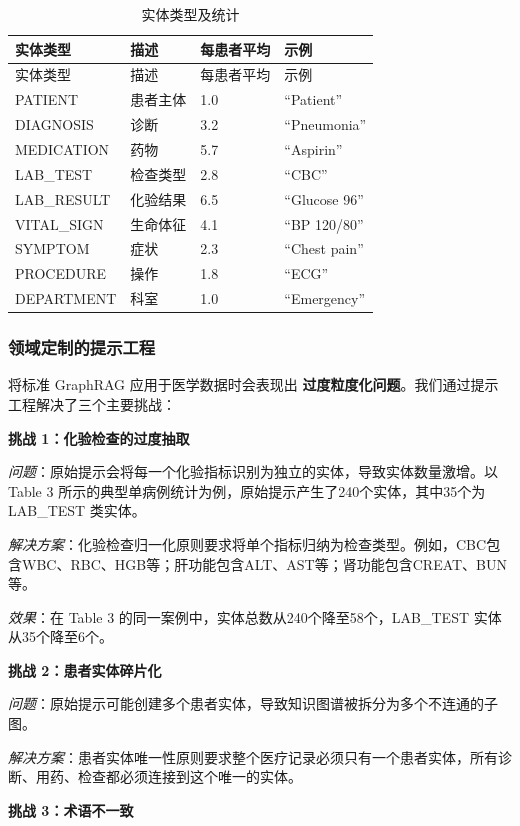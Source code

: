 \documentclass[11pt]{article}
\begin{document}
\begin{longtable}[]{@{}llll@{}}
\caption{实体类型及统计}\tabularnewline
\toprule\noalign{}
实体类型 & 描述 & 每患者平均 & 示例 \\
\midrule\noalign{}
\endfirsthead
\toprule\noalign{}
实体类型 & 描述 & 每患者平均 & 示例 \\
\midrule\noalign{}
\endhead
\bottomrule\noalign{}
\endlastfoot
PATIENT & 患者主体 & 1.0 & ``Patient'' \\
DIAGNOSIS & 诊断 & 3.2 & ``Pneumonia'' \\
MEDICATION & 药物 & 5.7 & ``Aspirin'' \\
LAB\_TEST & 检查类型 & 2.8 & ``CBC'' \\
LAB\_RESULT & 化验结果 & 6.5 & ``Glucose 96'' \\
VITAL\_SIGN & 生命体征 & 4.1 & ``BP 120/80'' \\
SYMPTOM & 症状 & 2.3 & ``Chest pain'' \\
PROCEDURE & 操作 & 1.8 & ``ECG'' \\
DEPARTMENT & 科室 & 1.0 & ``Emergency'' \\
\end{longtable}

\subsubsection{领域定制的提示工程}

将标准 GraphRAG 应用于医学数据时会表现出 \textbf{过度粒度化问题}。我们通过提示工程解决了三个主要挑战：

\textbf{挑战 1：化验检查的过度抽取}

\emph{问题}：原始提示会将每一个化验指标识别为独立的实体，导致实体数量激增。以 Table 3 所示的典型单病例统计为例，原始提示产生了240个实体，其中35个为 LAB\_TEST 类实体。

\emph{解决方案}：化验检查归一化原则要求将单个指标归纳为检查类型。例如，CBC包含WBC、RBC、HGB等；肝功能包含ALT、AST等；肾功能包含CREAT、BUN等。

\emph{效果}：在 Table 3 的同一案例中，实体总数从240个降至58个，LAB\_TEST 实体从35个降至6个。

\textbf{挑战 2：患者实体碎片化}

\emph{问题}：原始提示可能创建多个患者实体，导致知识图谱被拆分为多个不连通的子图。

\emph{解决方案}：患者实体唯一性原则要求整个医疗记录必须只有一个患者实体，所有诊断、用药、检查都必须连接到这个唯一的实体。

\textbf{挑战 3：术语不一致}
\end{document}
